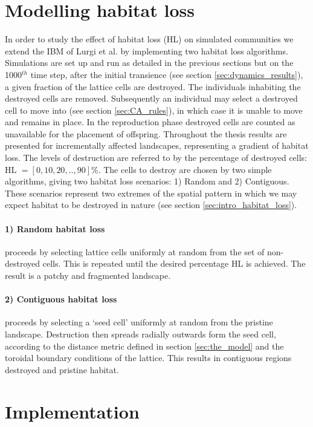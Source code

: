 \section{Modelling habitat loss}
\label{sec:model_HL}

In order to study the effect of habitat loss (HL) on simulated communities we extend the IBM of Lurgi et al. \cite{lurgi2015effects} by implementing two habitat loss algorithms. Simulations are set up and run as detailed in the previous sections but on the 1000$^{th}$ time step, after the initial transience (see section \ref{sec:dynamics_results}), a given fraction of the lattice cells are destroyed. The individuals inhabiting the destroyed cells are removed. Subsequently an individual may select a destroyed cell to move into (see section \ref{sec:CA_rules}), in which case it is unable to move and remains in place. In the reproduction phase destroyed cells are counted as unavailable for the placement of offspring. Throughout the thesis results are presented for incrementally affected landscapes, representing a gradient of habitat loss. The levels of destruction are referred to by the percentage of destroyed cells: HL $=[0,10,20,..,90] \%$. The cells to destroy are chosen by two simple algorithms, giving two habitat loss scenarios: 1) Random and 2) Contiguous. These scenarios represent two extremes of the spatial pattern in which we may expect habitat to be destroyed in nature (see section \ref{sec:intro_habitat_loss}).

\paragraph*{1) Random habitat loss} proceeds by selecting lattice cells uniformly at random from the set of non-destroyed cells. This is repeated until the desired percentage HL is achieved. The result is a patchy and fragmented landscape.  

\paragraph*{2) Contiguous habitat loss} proceeds by selecting a `seed cell' uniformly at random from the pristine landscape. Destruction then spreads radially outwards form the seed cell, according to the distance metric defined in section \ref{sec:the_model} and the toroidal boundary conditions of the lattice. This results in contiguous regions destroyed and pristine habitat.
 

\section{Implementation}
\label{sec:implementation}


